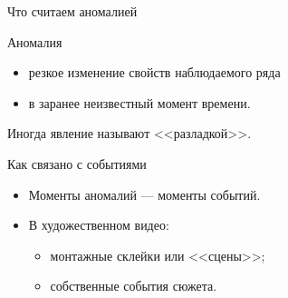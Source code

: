 \begin{frame}{Что считаем аномалией}

    \begin{gray-box}{Аномалия}
        \begin{itemize}
            \item резкое изменение свойств наблюдаемого ряда
            \item в заранее неизвестный момент времени.
        \end{itemize}
        Иногда явление называют <<разладкой>>.
    \end{gray-box}
    \vspace{2em}
    \begin{orange-box}{Как связано с событиями}
        \begin{itemize}
            \item Моменты аномалий — моменты событий.
            \item В художественном видео:
            \begin{itemize}
                \item монтажные склейки или <<сцены>>;
                \item собственные события сюжета.
            \end{itemize}
        \end{itemize}
    \end{orange-box}
\end{frame}
